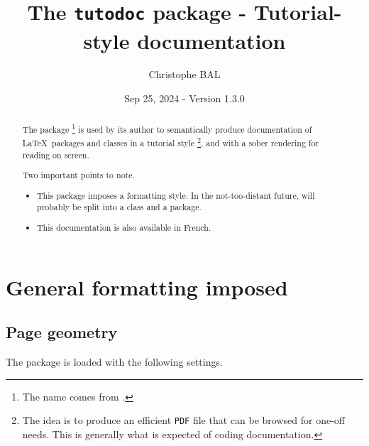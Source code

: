 \title{The \texttt{tutodoc} package - Tutorial-style documentation}
\author{Christophe BAL}
\date{Sep 25, 2024 - Version 1.3.0}

\maketitle

\begin{abstract}
    The \thispack{} package
    \footnote{
        The name comes from .
    }
    is used by its author to semantically produce documentation of \LaTeX\ packages and classes in a tutorial style
    \footnote{
        The idea is to produce an efficient \texttt{PDF} file that can be browsed for one-off needs. This is generally what is expected of coding documentation.
    },
    and with a sober rendering for reading on screen.

    \medskip

    Two important points to note.
    \begin{itemize}
        \item This package imposes a formatting style. In the not-too-distant future, \thispack{} will probably be split into a class and a package.

        \item This documentation is also available in French.
    \end{itemize}
\end{abstract}


\newpage
\tableofcontents
\newpage


\section{General formatting imposed}

\subsection{Page geometry}

The  package is loaded with the following settings.


\begin{tdoclatex}[code]
\RequirePackage[
  top            = 2.5cm,
  bottom         = 2.5cm,
  left           = 2.5cm,
  right          = 2.5cm,
  marginparwidth = 2cm,
  marginparsep   = 2mm,
  heightrounded
]{geometry}
\end{tdoclatex}


